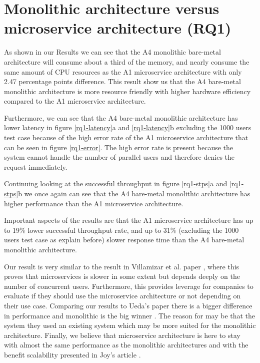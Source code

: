 \documentclass[a4paper,oneside]{bth}
\begin{document}
\section{Monolithic architecture versus microservice architecture (RQ1)}
As shown in our Results we can see that the A4 monolithic bare-metal architecture will consume about a third of the memory, and nearly consume the same amount of CPU resources as the A1 microservice architecture with only 2.47 percentage points difference. This result show us that the A4 bare-metal monolithic architecture is more resource friendly with higher hardware efficiency compared to the A1 microservice architecture. 

\par\vspace{0.5cm}
Furthermore, we can see that the A4 bare-metal monolithic architecture has lower latency in figure \ref{rq1-latency}a and \ref{rq1-latency}b excluding the 1000 users test case because of the high error rate of the A1 microservice architecture that can be seen in figure \ref{rq1-error}. The high error rate is present because the system cannot handle the number of parallel users and therefore denies the request immediately.

\par\vspace{0.5cm}
Continuing looking at the successful throughput in figure \ref{rq1-stps}a and \ref{rq1-stps}b we once again can see that the A4 bare-metal monolithic architecture has higher performance than the A1 microservice architecture.

\par\vspace{0.5cm}
Important aspects of the results are that the A1 microservice architecture has up to 19\% lower successful throughput rate, and up to 31\% (excluding the 1000 users test case as explain before) slower response time than the A4 bare-metal monolithic architecture.

\par\vspace{0.5cm}
Our result is very similar to the result in Villamizar et al. paper \cite{Villamizar}, where this proves that microservices is slower in some extent but depends deeply on the number of concurrent users. Furthermore, this provides leverage for companies to evaluate if they should use the microservice architecture or not depending on their use case. Comparing our results to Ueda's paper there is a bigger difference in performance and monolithic is the big winner \cite{Ueda}. The reason for may be that the system they used an existing system which may be more suited for the monolithic architecture.
Finally, we believe that microservice architecture is here to stay with almost the same performance as the monolithic architectures and with the benefit scalability presented in Joy's article \cite{Joy}.
\end{document}

